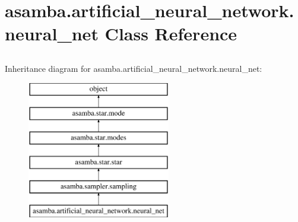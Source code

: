 \hypertarget{classasamba_1_1artificial__neural__network_1_1neural__net}{}\section{asamba.\+artificial\+\_\+neural\+\_\+network.\+neural\+\_\+net Class Reference}
\label{classasamba_1_1artificial__neural__network_1_1neural__net}


\paragraph*{}

\subsection*{}

\subsection*{}

\subsection*{}

\subsection*{}

\subsection*{}

\subparagraph*{} 


Inheritance diagram for asamba.\+artificial\+\_\+neural\+\_\+network.\+neural\+\_\+net\+:\begin{figure}[H]
\begin{center}
\leavevmode
\includegraphics[height=6.000000cm]{classasamba_1_1artificial__neural__network_1_1neural__net}
\end{center}
\end{figure}

